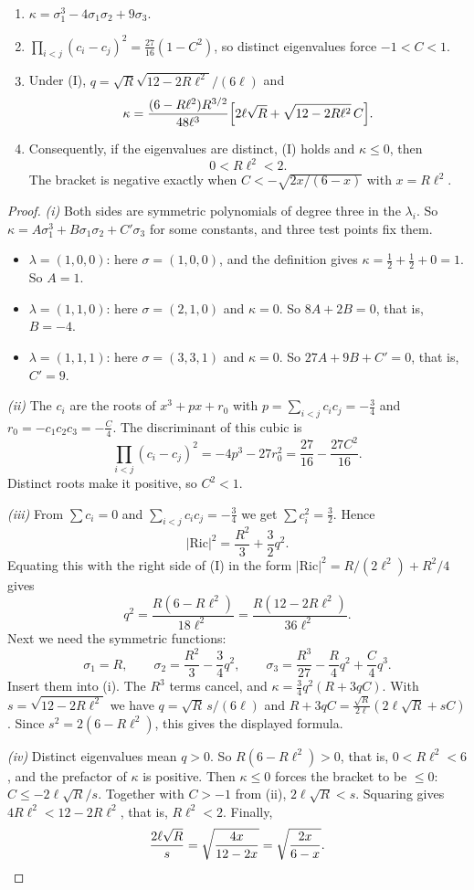 \begin{theorem}[Window]\label{thm:window}\ver\
\begin{enumerate}[label=(\roman*)]
\item $\kappa=\sigma_1^3-4\sigma_1\sigma_2+9\sigma_3$.
\item $\prod_{i<j}(c_i-c_j)^2=\frac{27}{16}(1-C^2)$, so distinct eigenvalues force $-1<C<1$.
\item Under (I), $q=\sqrt R\sqrt{12-2R\ell^2}/(6\ell)$ and
\[
\kappa=\frac{(6-R\ell^2)R^{3/2}}{48\ell^3}\Bigl[2\ell\sqrt R+\sqrt{12-2R\ell^2}\,C\Bigr].
\]
\item Consequently, if the eigenvalues are distinct, (I) holds and $\kappa\le0$, then
\[
0<R\ell^2<2 .
\]
The bracket is negative exactly when $C<-\sqrt{2x/(6-x)}$ with $x=R\ell^2$.
\end{enumerate}
\end{theorem}
\begin{proof}
\emph{(i)} Both sides are symmetric polynomials of degree three in the $\lambda_i$. So $\kappa=A\sigma_1^3+B\sigma_1\sigma_2+C'\sigma_3$ for some constants, and three test points fix them.
\begin{itemize}[nosep]
\item $\lambda=(1,0,0)$: here $\sigma=(1,0,0)$, and the definition gives $\kappa=\frac12+\frac12+0=1$. So $A=1$.
\item $\lambda=(1,1,0)$: here $\sigma=(2,1,0)$ and $\kappa=0$. So $8A+2B=0$, that is, $B=-4$.
\item $\lambda=(1,1,1)$: here $\sigma=(3,3,1)$ and $\kappa=0$. So $27A+9B+C'=0$, that is, $C'=9$.
\end{itemize}

\emph{(ii)} The $c_i$ are the roots of $x^3+px+r_0$ with $p=\sum_{i<j}c_ic_j=-\frac34$ and $r_0=-c_1c_2c_3=-\frac C4$. The discriminant of this cubic is
\[
\prod_{i<j}(c_i-c_j)^2=-4p^3-27r_0^2=\frac{27}{16}-\frac{27C^2}{16}.
\]
Distinct roots make it positive, so $C^2<1$.

\emph{(iii)} From $\sum c_i=0$ and $\sum_{i<j}c_ic_j=-\frac34$ we get $\sum c_i^2=\frac32$. Hence
\[
|\mathrm{Ric}|^2=\frac{R^2}3+\frac32q^2 .
\]
Equating this with the right side of (I) in the form $|\mathrm{Ric}|^2=R/(2\ell^2)+R^2/4$ gives
\[
q^2=\frac{R(6-R\ell^2)}{18\ell^2}=\frac{R(12-2R\ell^2)}{36\ell^2}.
\]
Next we need the symmetric functions:
\[
\sigma_1=R,\qquad\sigma_2=\frac{R^2}3-\frac34q^2,\qquad\sigma_3=\frac{R^3}{27}-\frac R4q^2+\frac C4q^3 .
\]
Insert them into (i). The $R^3$ terms cancel, and $\kappa=\frac34q^2(R+3qC)$. With $s=\sqrt{12-2R\ell^2}$ we have $q=\sqrt R\,s/(6\ell)$ and $R+3qC=\frac{\sqrt R}{2\ell}(2\ell\sqrt R+sC)$. Since $s^2=2(6-R\ell^2)$, this gives the displayed formula.

\emph{(iv)} Distinct eigenvalues mean $q>0$. So $R(6-R\ell^2)>0$, that is, $0<R\ell^2<6$, and the prefactor of $\kappa$ is positive. Then $\kappa\le0$ forces the bracket to be $\le0$: $C\le-2\ell\sqrt R/s$. Together with $C>-1$ from (ii), $2\ell\sqrt R<s$. Squaring gives $4R\ell^2<12-2R\ell^2$, that is, $R\ell^2<2$. Finally,
\[
\frac{2\ell\sqrt R}s=\sqrt{\frac{4x}{12-2x}}=\sqrt{\frac{2x}{6-x}} .\qedhere
\]
\end{proof}


